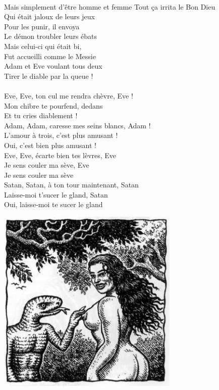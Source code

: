 \\Mais simplement d'être homme et femme
\breakpage
Tout ça irrita le Bon Dieu 
\\Qui était jaloux de leurs jeux
\\Pour les punir, il envoya 
\\Le démon troubler leurs ébats
\\Mais celui-ci qui était bi, 
\\Fut accueilli comme le Messie
\\Adam et Eve voulant tous deux 
\\Tirer le diable par la queue !
\\\\Eve, Eve, ton cul me rendra chèvre, Eve !
\\Mon chibre te pourfend, dedans 
\\Et tu cries diablement !
\\Adam, Adam, caresse mes seins blancs, Adam !
\\L'amour à trois, c'est plus amusant !
\\Oui, c'est bien plus amusant !
\\Eve, Eve, écarte bien tes lèvres, Eve
\\Je sens couler ma sève, Eve
\\Je sens couler ma sève
\\Satan, Satan, à ton tour maintenant, Satan
\\Laisse-moi t'sucer le gland, Satan
\\Oui, laisse-moi te sucer le gland

\begin{center}
\includegraphics[width=0.65\textwidth]{images/adam_eve.jpg}
\end{center}

\breakpage